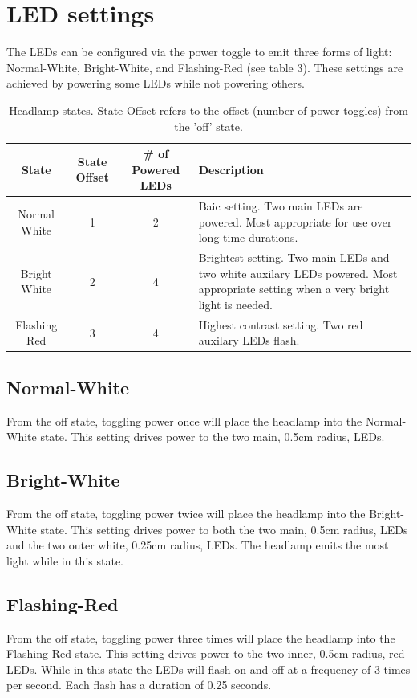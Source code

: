 \documentclass[12pt]{article}
\begin{document}
\section{LED settings}
The LEDs can be configured via the power toggle to emit three forms of light: Normal-White,
Bright-White, and Flashing-Red (see table 3). These settings are achieved by powering some LEDs while not
powering others.

\begin{table}
\begin{center}
\begin{tabular}{ | c | c | c | p{5cm} |}
    \hline
    State & State Offset & \# of Powered LEDs & Description \\ \hline
    Normal White & 1 & 2 &  Baic setting. Two main LEDs are powered. Most appropriate for use over
    long time durations.\\ \hline
    Bright White & 2 & 4 &  Brightest setting. Two main LEDs and two white auxilary LEDs powered.
    Most appropriate setting when a very bright light is needed.\\ \hline
    Flashing Red & 3 & 4 &  Highest contrast setting. Two red auxilary LEDs flash.\\ \hline
\end{tabular}
\end{center}
\caption[Lamp Power States] {Headlamp states. State Offset refers to the offset (number of power toggles) from the 'off' state.}
\end{table}

\subsection{Normal-White}
From the off state, toggling power once will place the headlamp into the Normal-White state.  This
setting drives power to the two main, 0.5cm radius, LEDs.

\subsection{Bright-White}
From the off state, toggling power twice will place the headlamp into the Bright-White state.  This
setting drives power to both the two main, 0.5cm radius, LEDs and the two outer white, 0.25cm
radius, LEDs. The headlamp emits the most light while in this state.

\subsection{Flashing-Red}
From the off state, toggling power three times will place the headlamp into the Flashing-Red state.
This setting drives power to the two inner, 0.5cm radius, red LEDs. While in this state the
LEDs will flash on and off at a frequency of 3 times per second. Each flash has a duration of
0.25 seconds.
\end{document}
